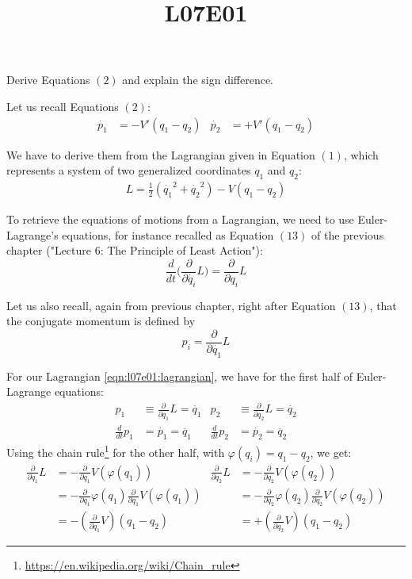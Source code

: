 \documentclass[solutions.tex]{subfiles}
\title{L07E01}
\begin{document}
\maketitle
\begin{exercise}
Derive Equations $(2)$ and explain the sign difference.
\end{exercise}

Let us recall Equations $(2)$:
\begin{align*}
	\dot{p_1} &= -V'(q_1-q_2) &
	\dot{p_2} &= +V'(q_1-q_2)
\end{align*}

We have to derive them from the Lagrangian given in Equation $(1)$,
which represents a system of two generalized coordinates $q_1$
and $q_2$:
\begin{align}
	L = \frac{1}{2}(\dot{q_1}^2+\dot{q_2}^2) - V(q_1-q_2)
	\label{eqn:l07e01:lagrangian}
\end{align}

To retrieve the equations of motions from a Lagrangian, we need
to use Euler-Lagrange's equations, for instance recalled as
Equation $(13)$ of the previous chapter ("Lecture $6$:
The Principle of Least Action"):
\[
	\frac{d}{dt}\biggl(\frac{\partial}{\partial \dot{q_i}}L\biggr)
	= \frac{\partial}{\partial q_i}L
\]

Let us also recall, again from previous chapter, right after
Equation $(13)$, that the conjugate momentum is defined by
\[
	p_i = \frac{\partial}{\partial \dot{q_1}}L
\]

For our Lagrangian \eqref{eqn:l07e01:lagrangian}, we have
for the first half of Euler-Lagrange equations:
\begin{align}
	p_1 &\equiv \frac{\partial}{\partial \dot{q_1}}L = \dot{q_1} &
	p_2 &\equiv \frac{\partial}{\partial \dot{q_2}}L = \dot{q_2} \label{eqn:l07e01:p1} \\
	\frac{d}{dt}p_1 &= \dot{p_1} = \ddot{q_1} &
	\frac{d}{dt}p_2 &= \dot{p_2} = \ddot{q_2} \label{eqn:l07e01:p2}
\end{align}
Using the chain
rule\footnote{\url{https://en.wikipedia.org/wiki/Chain\_rule}}
for the other half, with $\varphi(q_i) = q_1-q_2$, we get:
\begin{align}
	\frac{\partial}{\partial q_1}L &=
		-\frac{\partial}{\partial q_1}V(\varphi(q_1)) &
	\frac{\partial}{\partial q_2}L &=
		-\frac{\partial}{\partial q_2}V(\varphi(q_2)) \nonumber \\
	~ &= -\frac{\partial}{\partial q_1}\varphi(q_1)
		\frac{\partial}{\partial q_1}V(\varphi(q_1)) &
	~ &= -\frac{\partial}{\partial q_2}\varphi(q_2)
		\frac{\partial}{\partial q_2}V(\varphi(q_2)) \nonumber \\
	~ &= -(\frac{\partial}{\partial q_1}V)(q_1-q_2) &
	~ &= +(\frac{\partial}{\partial q_2}V)(q_1-q_2) \label{eqn:l07e01:p3}
\end{align}
\end{document}
